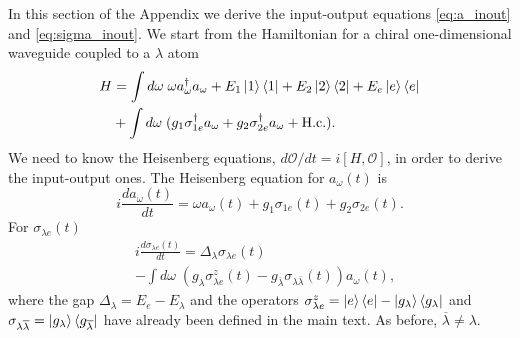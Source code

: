 \documentclass[notitlepage, prx, preprint, amsmath,superscriptaddress,amssymb]{revtex4-1}
\begin{document}
In this section of the Appendix we derive the input-output equations \eqref{eq:a_inout} and \eqref{eq:sigma_inout}. We start from the Hamiltonian for a chiral one-dimensional waveguide coupled to a $\lambda$ atom
\begin{align}
H & = \int d\omega \; \omega a_\omega^\dagger a_\omega + E_1\ket{1}\bra{1} + E_2\ket{2}\bra{2} + E_e\ket{e}\bra{e}\nonumber\\
& + \int d\omega\; (g_1\sigma_{1e}^\dagger a_\omega + g_2 \sigma_{2e}^\dagger a_\omega + \text{H.c.}).
\end{align}
We need to know the Heisenberg equations, $d\mathcal{O}/dt=i[H,\mathcal{O}]$, in order to derive the input-output ones. The Heisenberg equation for $a_\omega(t)$ is
\begin{equation}\label{eq:aw_Heisenberg}
i\frac{d a_\omega(t)}{dt}=\omega a_\omega(t) + g_1 \sigma_{1e}(t) + g_2 \sigma_{2e}(t).
\end{equation}
For $\sigma_{\lambda e}(t)$
\begin{align}\label{eq:sigma_Heisenberg}
&i\frac{d\sigma_{\lambda e}(t)}{dt}=\Delta_\lambda \sigma_{\lambda e}(t)\nonumber\\
&-\int d\omega\; (g_\lambda \sigma_{\lambda e}^z(t)-g_{\overline{\lambda}} \sigma_{\lambda\overline{\lambda}}(t))a_\omega(t),
\end{align}
where the gap $\Delta_\lambda=E_e-E_\lambda$ and the operators $\sigma_{\lambda e}^z=\ket{e}\bra{e}-\ket{g_\lambda}\bra{g_\lambda}$ and $\sigma_{\lambda\overline{\lambda}}=\ket{g_\lambda}\bra{g_{\overline{\lambda}}}$ have already been defined in the main text. As before, $\overline{\lambda}\neq \lambda$.
\end{document}
